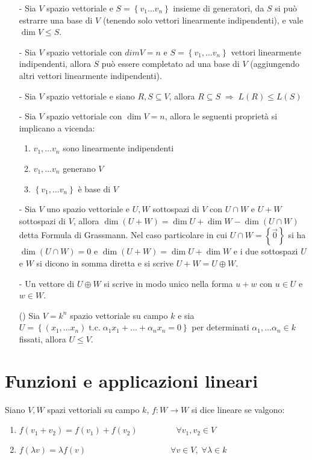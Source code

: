 \documentclass[a4paper]{article}
\newcommand\tc{\;\text{t.c.}\;} %
\begin{document}
\begin{itemize}
	\item[-] Sia \(V\) spazio vettoriale e \(S = \left\{ v_1 \dots v_n \right\}\) insieme di generatori, da \(S\) si può estrarre
	una base di \(V\) (tenendo solo vettori linearmente indipendenti), e vale \(\dim V \leq S\).
	
	\item[-] Sia \(V\) spazio vettoriale con \(dim V = n\) e \(S = \left\{ v_1, \dots v_n \right\}\) vettori linearmente indipendenti,
	allora \(S\) può essere completato ad una base di \(V\) (aggiungendo altri vettori linearmente indipendenti).
	
	\item[-] Sia \(V\) spazio vettoriale e siano \(R,S \subseteq V\), allora \(R \subseteq S \; \Rightarrow \; L(R) \leq L(S)\)
	
	\item[-] Sia \(V\) spazio vettoriale con \(\dim V = n\), allora le seguenti proprietà si implicano a vicenda:
	\begin{enumerate}
		\item \(v_1, \dots v_n\) sono linearmente indipendenti
		\item \(v_1, \dots v_n\) generano \(V\)
		\item \(\left\{ v_1, \dots v_n \right\}\) è base di \(V\)
	\end{enumerate}
	
	\item[-] Sia \(V\) uno spazio vettoriale e \(U, W\) sottospazi di \(V\) con \(U \cap W\) e \(U + W\) sottospazi di \(V\), allora
	\(\dim (U + W) = \dim U + \dim W - \dim (U \cap W)\) detta Formula di Grassmann. Nel caso particolare in cui \(U \cap W = \left\{ \vec{0} \right\}\)
	si ha \(\dim (U \cap W) = 0\) e \(\dim (U + W) = \dim U + \dim W\) e i due sottospazi \(U\) e \(W\) si dicono in somma diretta
	e si scrive \(U + W = U \oplus W\).

	\item[-] Un vettore di \(U \oplus W\) si scrive in modo unico nella forma \(u + w\) con \(u \in U\) e \(w \in W\).
	
	\item[()] Sia \(V = k^n\) spazio vettoriale su campo \(k\) e sia \(U = \left\{ (x_1, \dots x_n) \tc \alpha_1 x_1 + \dots + \alpha_n x_n = 0\right\}\)
	per determinati \(\alpha_1, \dots \alpha_n \in k\) fissati, allora \(U \leq V\).
\end{itemize}

\newpage

\section{Funzioni e applicazioni lineari}
Siano \(V, W\) spazi vettoriali su campo \(k\), \(f: W \to W\) si dice lineare se valgono:
\begin{enumerate}
	\item \(f(v_1 + v_2) = f(v_1) + f(v_2) \qquad \qquad \;\; \forall v_1, v_2 \in V\)
	\item \(f(\lambda v) = \lambda f(v) \qquad \qquad \qquad \qquad \qquad \forall v \in V, \; \forall \lambda \in k\)
\end{enumerate}
\end{document}
